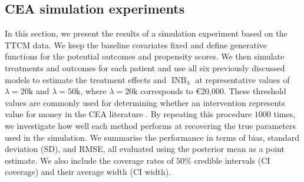 \documentclass[aoas,preprint]{imsart}
\theoremstyle{plain}
\theoremstyle{definition}
\theoremstyle{remark}
\begin{document}
\subsection{CEA simulation experiments}\label{sec:TTCM_sim}
In this section, we present the results of a simulation experiment based on the TTCM data. We keep the baseline covariates fixed and define generative functions for the potential outcomes and propensity scores. We then simulate treatments and outcomes for each patient and use all six previously discussed models to estimate the treatment effects and $\operatorname{INB}_\lambda$ at representative values of $\lambda=20\mathrm{k}$ and $\lambda=50\mathrm{k}$, where $\lambda=20\mathrm{k}$ corresponds to €20,000. These threshold values are commonly used for determining whether an intervention represents value for money in the CEA literature \citep{drummond2015methods,gabrio2019bayesian}.
By repeating this procedure $1000$ times, we investigate how well each method performs at recovering the true parameters used in the simulation. We summarise the performance in terms of bias, standard deviation (SD), and RMSE, all evaluated using the posterior mean as a point estimate. We also include the coverage rates of $50\%$ credible intervals (CI coverage) and their average width (CI width). 
\end{document}
